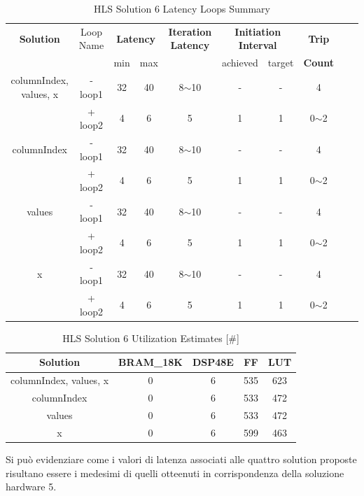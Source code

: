 \begin{table}[H]
	\centering
	\begin{tabular}{|c|c|c|c|c|c|c|c|c|c|}
		\hline
		\multicolumn{1}{|c|}{\textbf{Solution}} & \multicolumn{1}{|c|}{Loop Name} & \multicolumn{2}{|c|}{\textbf{Latency}} & \multicolumn{1}{c|}{\textbf{Iteration Latency}} & \multicolumn{2}{c|}{\textbf{Initiation Interval}} & \multicolumn{1}{c|}{\textbf{Trip}}  \\
		&  & min & max & & achieved & target & \textbf{Count} \\
		\hline
		columnIndex, values, x & - loop1 & 32 & 40 & 8$\sim$10 & - & - & 4 \\
		& + loop2 & 4 & 6 & 5 & 1 & 1 & 0$\sim$2 \\
		\hline
		columnIndex & - loop1 & 32 & 40 & 8$\sim$10 & - & - & 4 \\
		& + loop2 & 4 & 6 & 5 & 1 & 1 & 0$\sim$2 \\
		\hline
		values & - loop1 & 32 & 40 & 8$\sim$10 & - & - & 4 \\
		& + loop2 & 4 & 6 & 5 & 1 & 1 & 0$\sim$2 \\
		\hline
		x & - loop1 & 32 & 40 & 8$\sim$10 & - & - & 4 \\
		& + loop2 & 4 & 6 & 5 & 1 & 1 & 0$\sim$2 \\
		\hline
	\end{tabular}
	\caption{HLS Solution 6 Latency Loops Summary }
	\label{tab:hls-solution-6-loop-summary}
\end{table}

\begin{table}[H]
	\centering
	\begin{tabular}{|c|c|c|c|c|}
		\hline
		\textbf{Solution} & \textbf{BRAM\_18K} & \textbf{DSP48E} & \textbf{FF} & \textbf{LUT} \\
		\hline
		columnIndex, values, x & 0 & 6 & 535 & 623 \\
		\hline
		columnIndex & 0 & 6 & 533 & 472 \\
		\hline
		values & 0 & 6 & 533 & 472 \\
		\hline
		x & 0 & 6 & 599 & 463 \\
		\hline
	\end{tabular}
	\caption{HLS Solution 6 Utilization Estimates [\#]}
	\label{tab:hls-solution-6-utilization-report}
\end{table}

Si può evidenziare come i valori di latenza associati alle quattro solution proposte risultano essere i medesimi di quelli otteenuti in corrispondenza della soluzione hardware 5.


